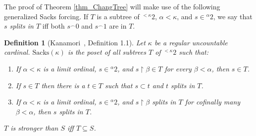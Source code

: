 \documentclass{amsart}
\newtheorem{definition}[theorem]{Definition}
\begin{document}
The proof of Theorem \ref{thm_ChangTree} will make use of the following generalized Sacks forcing.  If $T$ is a subtree of ${}^{<\kappa} 2$, $\alpha < \kappa$, and $s \in {}^\alpha 2$, we say that \emph{$s$ splits in $T$} iff both $s^\frown 0$ and $s^\frown 1$ are in $T$.  
\begin{definition}[Kanamori~\cite{MR593029}, Definition 1.1]\label{def_Sacks}
Let $\kappa$ be a regular uncountable cardinal.  $\text{Sacks}(\kappa)$ is the poset of all subtrees $T$ of ${}^{<\kappa} 2$ such that:
\begin{enumerate}
 \item\label{item_Closed} If $\alpha < \kappa$ is a limit ordinal, $s \in {}^\alpha 2$, and $s \restriction \beta \in T$ for every $\beta < \alpha$, then $s \in T$.
 \item\label{item_Splits} If $s \in T$ then there is a $t \in T$ such that $s \subset t$ and $t$ splits in $T$.
 \item\label{item_ClubSplitLevels} If $\alpha < \kappa$ is a limit ordinal, $s \in {}^\alpha 2$, and $s \restriction \beta$ splits in $T$ for cofinally many $\beta <\alpha$, then $s$ splits in $T$.
\end{enumerate}
$T$ is stronger than $S$ iff $T \subseteq S$.
\end{definition}
\end{document}
